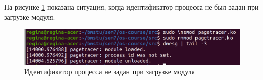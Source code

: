 На рисунке \ref{img:example2} показана ситуация, когда идентификатор процесса не был задан при загрузке модуля.
    
\begin{figure}[H]
	\begin{center}
		\includegraphics[scale=0.45]{inc/img/example2.png}
	\end{center}
	\captionsetup{justification=centering}
	\caption{Идентификатор процесса не задан при загрузке модуля}
	\label{img:example2}
\end{figure}
